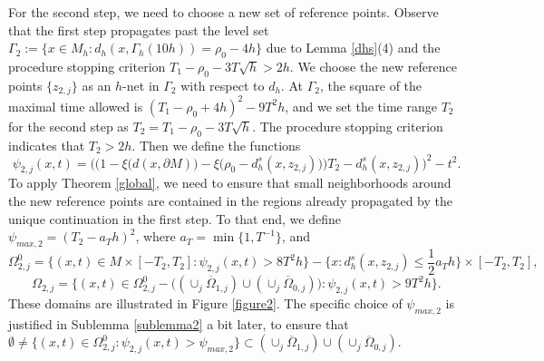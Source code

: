 \documentclass[11pt,letterpaper]{amsart}
\numberwithin{equation}{section}
\theoremstyle{definition}
\theoremstyle{plain}
\theoremstyle{definition}
\theoremstyle{plain}
\theoremstyle{definition}
\theoremstyle{plain}
\begin{document}
For the second step, we need to choose a new set of reference points. Observe that the first step propagates past the level set $\Gamma_2:=\{x\in M_h: d_h(x,\Gamma_{h}(10h))=\rho_0-4h\}$ due to Lemma \ref{dhs}(4) and the procedure stopping criterion $T_1-\rho_0-3T\sqrt{h}>2h$. We choose the new reference points $\{z_{2,j}\}$ as an $h$-net in $\Gamma_2$ with respect to $d_h$. At $\Gamma_2$, the square of the maximal time allowed is $(T_1-\rho_0+4h)^2-9T^2h$, and we set the time range $T_2$ for the second step as $T_2=T_1-\rho_0-3T\sqrt{h}$. The procedure stopping criterion indicates that $T_2>2h$. Then we define the functions
$$\psi_{2,j}(x,t)=\bigg(\Big(1-\xi \big(d(x,\partial M)\big)-\xi \big(\rho_0-d_h^s(x,z_{2,j})\big)\Big)T_2-d_h^s(x,z_{2,j})\bigg)^2-t^2.$$
To apply Theorem \ref{global}, we need to ensure that small neighborhoods around the new reference points are contained in the regions already propagated by the unique continuation in the first step. To that end, we define $\psi_{max,2}=(T_2-a_T h)^2$, where $a_T=\min\{1,T^{-1}\}$, and
$$\Omega^{0}_{2,j}=\big\{(x,t)\in M\times [-T_2,T_2]: \psi_{2,j}(x,t) > 8T^2h \big\}-\{x: d_h^s(x,z_{2,j})\leqslant \frac{1}{2}a_T h \}\times [-T_2,T_2],$$
$$\Omega_{2,j}=\big\{(x,t)\in\Omega^{0}_{2,j}-\big((\cup_j \overline{\Omega}_{1,j})\cup (\cup_j \overline{\Omega}_{0,j})\big): \psi_{2,j}(x,t) > 9T^2 h \big\}.$$
These domains are illustrated in Figure \ref{figure2}. The specific choice of $\psi_{max,2}$ is justified in Sublemma \ref{sublemma2} a bit later, to ensure that $\emptyset\neq\{(x,t)\in \Omega^{0}_{2,j}: \psi_{2,j}(x,t)>\psi_{max,2}\}\subset (\cup_j \overline{\Omega}_{1,j})\cup (\cup_j \overline{\Omega}_{0,j})$.
\end{document}

